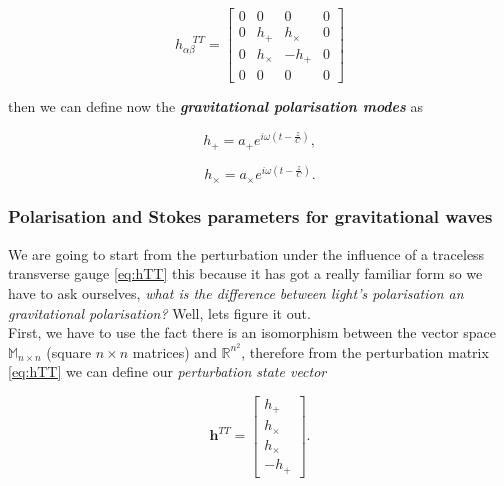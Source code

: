         \begin{equation}\label{eq:hTT}
            h_{\alpha\beta}^{\quad TT} =
            \begin{bmatrix}
                0&0&0&0\\
                0&h_+&h_{\times}&0\\
                0&h_{\times}&-h_+&0\\
                0&0&0&0
            \end{bmatrix}
        \end{equation}

        then we can define now the \textit{\textbf{gravitational polarisation modes}} as

        \begin{equation}
            h_+ = a_+e^{i\omega\left(t - \frac{z}{C} \right)},
        \end{equation}

        \begin{equation}
            h_{\times} = a_{\times}e^{i\omega\left(t - \frac{z}{C} \right)}.
        \end{equation}

        \subsubsection{Polarisation and Stokes parameters for gravitational waves}

            We are going to start from the perturbation under the influence of a traceless transverse gauge \ref{eq:hTT} this because it has got a really familiar form so we have to ask ourselves, \textit{what is the difference between light's polarisation an gravitational polarisation?} Well, lets figure it out.\\

            First, we have to use the fact there is an isomorphism between the vector space $\mathbb{M}_{n\times n}$ (square $n\times n$ matrices) and $\mathbb{R}^{n^2}$, therefore from the perturbation matrix \ref{eq:hTT} we can define our \textit{perturbation state vector}

            \begin{equation}
                \textbf{h}^{TT} =
                \begin{bmatrix}
                    h_+\\
                    h_{\times}\\
                    h_{\times}\\
                    -h_+
                \end{bmatrix}.
            \end{equation}

